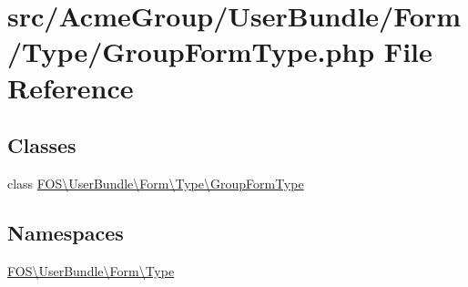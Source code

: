 \hypertarget{_group_form_type_8php}{\section{src/\+Acme\+Group/\+User\+Bundle/\+Form/\+Type/\+Group\+Form\+Type.php File Reference}
\label{_group_form_type_8php}
}
\subsection*{Classes}
\begin{DoxyCompactItemize}
\item 
class \hyperlink{class_f_o_s_1_1_user_bundle_1_1_form_1_1_type_1_1_group_form_type}{F\+O\+S\textbackslash{}\+User\+Bundle\textbackslash{}\+Form\textbackslash{}\+Type\textbackslash{}\+Group\+Form\+Type}
\end{DoxyCompactItemize}
\subsection*{Namespaces}
\begin{DoxyCompactItemize}
\item 
 \hyperlink{namespace_f_o_s_1_1_user_bundle_1_1_form_1_1_type}{F\+O\+S\textbackslash{}\+User\+Bundle\textbackslash{}\+Form\textbackslash{}\+Type}
\end{DoxyCompactItemize}
